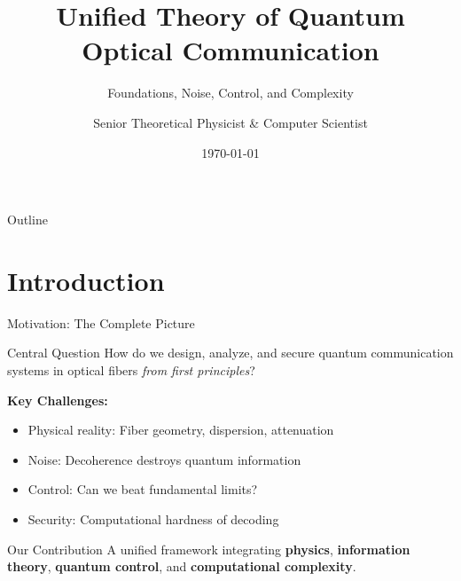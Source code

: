\documentclass[aspectratio=169,12pt]{beamer}
\title[Unified Theory of Quantum Optical Communication]{Unified Theory of Quantum Optical Communication}
\subtitle{Foundations, Noise, Control, and Complexity}
\author{Senior Theoretical Physicist \& Computer Scientist}
\institute{Quantum Information Science Conference}
\date{\today}
\begin{document}
\begin{frame}
\titlepage
\end{frame}

\begin{frame}{Outline}
\tableofcontents
\end{frame}

\section{Introduction}

\begin{frame}{Motivation: The Complete Picture}
\begin{block}{Central Question}
How do we design, analyze, and secure quantum communication systems in optical fibers \textit{from first principles}?
\end{block}

\vspace{0.3cm}

\textbf{Key Challenges:}
\begin{itemize}
\item Physical reality: Fiber geometry, dispersion, attenuation
\item Noise: Decoherence destroys quantum information
\item Control: Can we beat fundamental limits?
\item Security: Computational hardness of decoding
\end{itemize}

\vspace{0.3cm}

\begin{alertblock}{Our Contribution}
A unified framework integrating \textbf{physics}, \textbf{information theory}, \textbf{quantum control}, and \textbf{computational complexity}.
\end{alertblock}
\end{frame}
\end{document}
